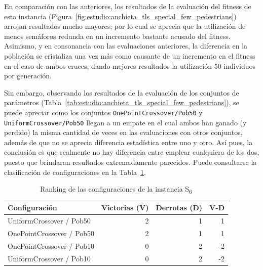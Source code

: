 En comparación con las anteriores, los resultados de la evaluación del fitness de esta instancia (Figura~\ref{fig:estudio:anchieta_tls_special_few_pedestrians}) arrojan resultados mucho mayores; por lo cual se aprecia que la utilización de menos semáforos redunda en un incremento bastante acusado del fitness. Asimismo, y en consonancia con las evaluaciones anteriores, la diferencia en la población se cristaliza una vez más como causante de un incremento en el fitness en el caso de ambos cruces, dando mejores resultados la utilización 50 individuos por generación.

Sin embargo, observando los resultados de la evaluación de los conjuntos de parámetros (Tabla~\ref{tab:estudio:anchieta_tls_special_few_pedestrians}), se puede apreciar como los conjuntos \texttt{OnePointCrossover/Pob50} y \texttt{UniformCrossover/Pob50} llegan a un empate en el cual ambos han ganado (y perdido) la misma cantidad de veces en las evaluaciones con otros conjuntos, además de que no se aprecia diferencia estadística entre uno y otro. Así pues, la conclusión es que realmente no hay diferencia entre emplear cualquiera de los dos, puesto que brindaran resultados extremadamente parecidos. Puede consultarse la clasificación de configuraciones en la Tabla~\ref{tab:rankingS6}.

\begin{table}[h]
\centering
\caption{Ranking de las configuraciones de la instancia S\textsubscript{6}}
\label{tab:rankingS6}
\begin{tabular}{lrrr}
\hline
\multicolumn{1}{l}{\textbf{Configuración}} & \textbf{Victorias (V)} & \textbf{Derrotas (D)} & \textbf{V-D} \\ \hline
UniformCrossover / Pob50                   & 2                      & 1                     & 1            \\ \hline
OnePointCrossover / Pob50                  & 2                      & 1                     & 1            \\ \hline
OnePointCrossover / Pob10                  & 0                      & 2                     & -2           \\ \hline
UniformCrossover / Pob10                   & 0                      & 2                     & -2           \\ \hline
\end{tabular}
\end{table}

